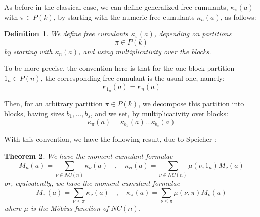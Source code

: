 \documentclass[12pt]{amsbook}
\newtheorem{theorem}{Theorem}[chapter]
\newtheorem{definition}[theorem]{Definition}
\begin{document}
As before in the classical case, we can define generalized free cumulants, $\kappa_\pi(a)$ with $\pi\in P(k)$, by starting with the numeric free cumulants $\kappa_n(a)$, as follows:

\begin{definition}
We define free cumulants $\kappa_\pi(a)$, depending on partitions 
$$\pi\in P(k)$$
by starting with $\kappa_n(a)$, and using multiplicativity over the blocks. 
\end{definition}

To be more precise, the convention here is that for the one-block partition $1_n\in P(n)$, the corresponding free cumulant is the usual one, namely:
$$\kappa_{1_n}(a)=\kappa_n(a)$$

Then, for an arbitrary partition $\pi\in P(k)$, we decompose this partition into blocks, having sizes $b_1,\ldots,b_s$, and we set, by multiplicativity over blocks:
$$\kappa_\pi(a)=\kappa_{b_1}(a)\ldots\kappa_{b_s}(a)$$

With this convention, we have the following result, due to Speicher \cite{sp1}:

\begin{theorem}
We have the moment-cumulant formulae
$$M_n(a)=\sum_{\nu\in NC(n)}\kappa_\nu(a)\quad,\quad 
\kappa_n(a)=\sum_{\nu\in NC(n)}\mu(\nu,1_n)M_\nu(a)$$
or, equivalently, we have the moment-cumulant formulae
$$M_\pi(a)=\sum_{\nu\leq\pi}\kappa_\nu(a)\quad,\quad 
\kappa_\pi(a)=\sum_{\nu\leq\pi}\mu(\nu,\pi)M_\nu(a)$$
where $\mu$ is the M\"obius function of $NC(n)$.
\end{theorem}
\end{document}
